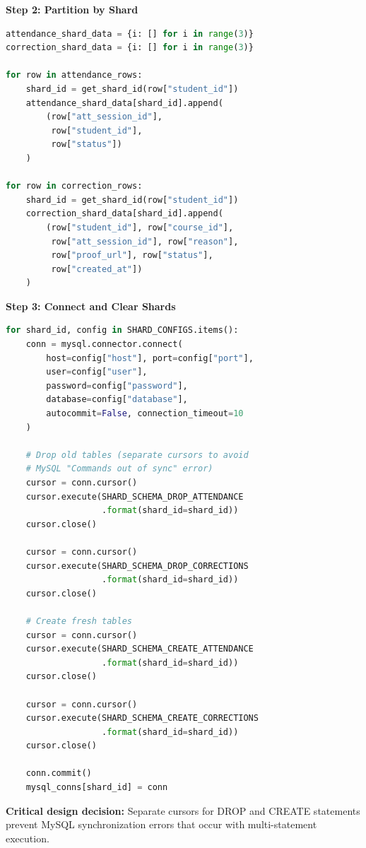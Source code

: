 \documentclass[conference]{IEEEtran}
\begin{document}
\textbf{Step 2: Partition by Shard}
\begin{lstlisting}[language=Python]
attendance_shard_data = {i: [] for i in range(3)}
correction_shard_data = {i: [] for i in range(3)}

for row in attendance_rows:
    shard_id = get_shard_id(row["student_id"])
    attendance_shard_data[shard_id].append(
        (row["att_session_id"], 
         row["student_id"], 
         row["status"])
    )

for row in correction_rows:
    shard_id = get_shard_id(row["student_id"])
    correction_shard_data[shard_id].append(
        (row["student_id"], row["course_id"], 
         row["att_session_id"], row["reason"], 
         row["proof_url"], row["status"], 
         row["created_at"])
    )
\end{lstlisting}

\textbf{Step 3: Connect and Clear Shards}
\begin{lstlisting}[language=Python]
for shard_id, config in SHARD_CONFIGS.items():
    conn = mysql.connector.connect(
        host=config["host"], port=config["port"],
        user=config["user"], 
        password=config["password"],
        database=config["database"],
        autocommit=False, connection_timeout=10
    )
    
    # Drop old tables (separate cursors to avoid 
    # MySQL "Commands out of sync" error)
    cursor = conn.cursor()
    cursor.execute(SHARD_SCHEMA_DROP_ATTENDANCE
                   .format(shard_id=shard_id))
    cursor.close()
    
    cursor = conn.cursor()
    cursor.execute(SHARD_SCHEMA_DROP_CORRECTIONS
                   .format(shard_id=shard_id))
    cursor.close()
    
    # Create fresh tables
    cursor = conn.cursor()
    cursor.execute(SHARD_SCHEMA_CREATE_ATTENDANCE
                   .format(shard_id=shard_id))
    cursor.close()
    
    cursor = conn.cursor()
    cursor.execute(SHARD_SCHEMA_CREATE_CORRECTIONS
                   .format(shard_id=shard_id))
    cursor.close()
    
    conn.commit()
    mysql_conns[shard_id] = conn
\end{lstlisting}

\textbf{Critical design decision:} Separate cursors for DROP and CREATE statements prevent MySQL synchronization errors that occur with multi-statement execution.
\end{document}
